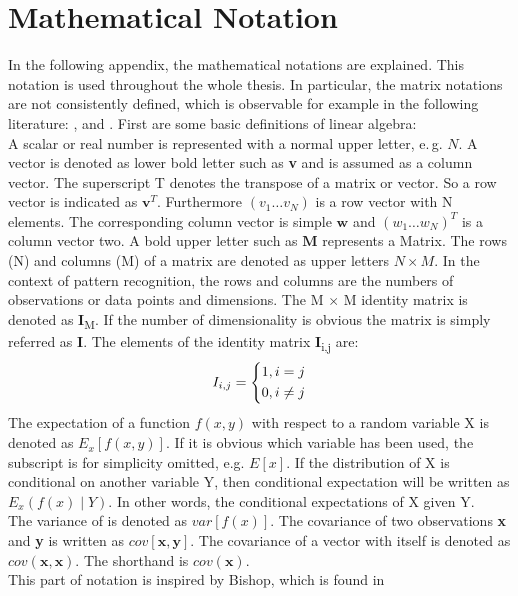 \chapter{Mathematical Notation}\label{appaA}
In the following appendix, the mathematical notations are explained.
This notation is used throughout the whole thesis.
In particular, the matrix notations are not consistently defined, which is observable for example in the following literature: \cite{Chen.2009}, \cite{Bishop.2009} and \cite{Long.2015}.
First are some basic definitions of linear algebra:\\
A scalar or real number is represented with a normal upper letter, e.\,g. $N$.
A vector is denoted as lower bold letter such as \textbf{v} and is assumed as a column vector.
The superscript T denotes the transpose of a matrix or vector. So a row vector is indicated as $\mathbf{v}^{T}$.
Furthermore $(v_1 \dots v_N)$ is a row vector with N elements.
The corresponding column vector is simple $\mathbf{w}$ and $(w_1 \dots w_N)^T$ is a column vector two.
A bold upper letter such as $\mathbf{M}$ represents a Matrix.
The rows (N) and columns (M) of a matrix are denoted as upper letters $N \times M$. 
In the context of pattern recognition, the rows and columns are the numbers of observations or data points and dimensions. 
The M $\times$ M identity matrix is denoted as \textbf{I}\textsubscript{M}.
If the number of dimensionality is obvious the matrix is simply referred as \textbf{I}.
The elements of the identity matrix \textbf{I}\textsubscript{i,j} are:
\[
I_{i,j}= \begin{dcases*}
1, i = j\\
0, i \neq j
\end{dcases*}
\]
The expectation of a function $f(x,y)$ with respect to a random variable X is denoted as $E_x[f(x,y)]$.
If it is obvious which variable has been used, the subscript is for simplicity omitted, e.g. $E[x]$.
If the distribution of X is conditional on another variable Y, then conditional expectation will be written as $E_x(f(x)\mid Y)$. In other words, the conditional expectations of X given Y.\\
The variance of is denoted as $var[f(x)]$.
The covariance of two observations \textbf{x} and \textbf{y} is written as $cov[\textbf{x},\textbf{y}]$.
The covariance of a vector with itself is denoted as $cov(\textbf{x},\textbf{x})$. The shorthand is $cov(\textbf{x})$.\\
This part of notation is inspired by Bishop, which is found in \cite[p. xi - xii]{Bishop.2009}\\
